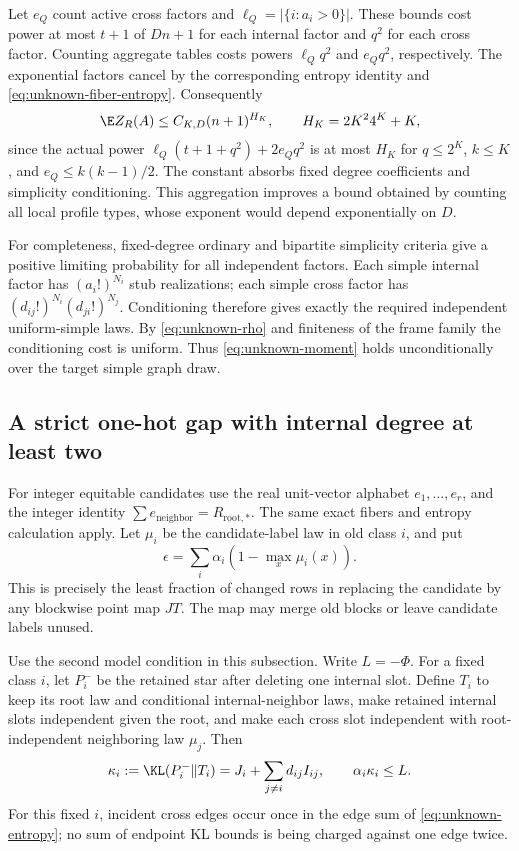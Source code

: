 Let $e_Q$ count active cross factors and
$\ell_Q=|\{i:a_i>0\}|$. These bounds cost power at most $t+1$
of $Dn+1$ for each internal factor and $q^2$ for each cross factor.
Counting aggregate tables costs powers $\ell_Qq^2$ and $e_Qq^2$,
respectively. The exponential factors cancel by the corresponding
entropy identity and \eqref{eq:unknown-fiber-entropy}.
Consequently
\begin{equation}\label{eq:unknown-moment}
 \E Z_R(A)\le C_{K,D}(n+1)^{H_K},\qquad
 H_K=2K^2 4^K+K,
\end{equation}
since the actual power
$\ell_Q(t+1+q^2)+2e_Qq^2$ is at most $H_K$ for $q\le2^K$,
$k\le K$, and $e_Q\le k(k-1)/2$.
The constant absorbs fixed degree coefficients and simplicity
conditioning. This aggregation improves a bound obtained by counting
all local profile types, whose exponent would depend exponentially
on $D$.

For completeness, fixed-degree ordinary and bipartite simplicity
criteria give a positive limiting probability for all independent
factors. Each simple internal factor has $(a_i!)^{N_i}$ stub
realizations; each simple cross factor has
$(d_{ij}!)^{N_i}(d_{ji}!)^{N_j}$. Conditioning therefore gives exactly
the required independent uniform-simple laws. By
\eqref{eq:unknown-rho} and finiteness of the frame family the
conditioning cost is uniform. Thus \eqref{eq:unknown-moment} holds
unconditionally over the target simple graph draw.

\subsection{A strict one-hot gap with internal degree at least two}
For integer equitable candidates use the real unit-vector alphabet
$e_1,\ldots,e_r$, and the integer identity
$\sum e_{\text{neighbor}}=R_{\text{root},*}$. The same exact fibers
and entropy calculation apply. Let $\mu_i$ be the candidate-label
law in old class $i$, and put
\begin{equation}\label{eq:unknown-distance}
 \epsilon=\sum_i\alpha_i(1-\max_x\mu_i(x)).
\end{equation}
This is precisely the least fraction of changed rows in replacing
the candidate by any blockwise point map $JT$. The map may merge
old blocks or leave candidate labels unused.

Use the second model condition in this subsection.
Write $L=-\Phi$. For a fixed class $i$, let $P_i^-$ be the retained
star after deleting one internal slot. Define $T_i$ to keep its root
law and conditional internal-neighbor laws, make retained internal
slots independent given the root, and make each cross slot independent
with root-independent neighboring law $\mu_j$.
Then
\begin{equation}\label{eq:unknown-KL}
 \kappa_i:=\KL(P_i^-\Vert T_i)
 =J_i+\sum_{j\ne i}d_{ij}I_{ij},\qquad
 \alpha_i\kappa_i\le L.
\end{equation}
For this fixed $i$, incident cross edges occur once in the edge sum
of \eqref{eq:unknown-entropy}; no sum of endpoint KL bounds is being
charged against one edge twice.

